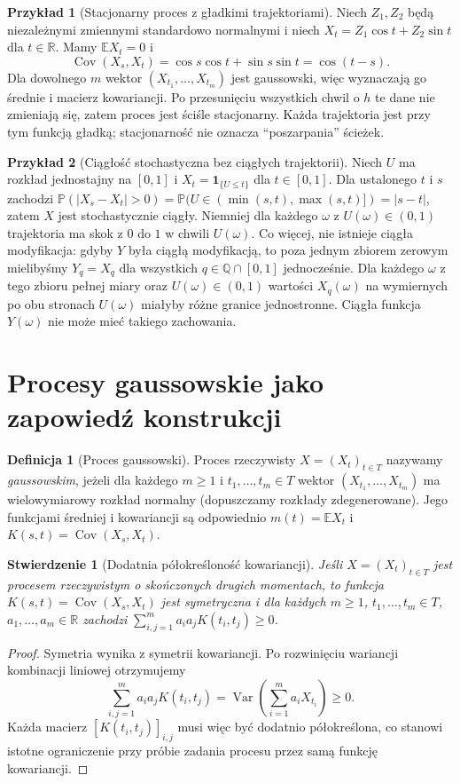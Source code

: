\documentclass[11pt,a4paper,oneside]{report}
\numberwithin{equation}{chapter}
\theoremstyle{plain}
\newtheorem{stwierdzenie}[twierdzenie]{Stwierdzenie}
\theoremstyle{definition}
\newtheorem{definicja}{Definicja}[chapter]
\newtheorem{przyklad}{Przykład}[chapter]
\theoremstyle{remark}
\newcommand{\R}{\mathbb{R}}
\newcommand{\Q}{\mathbb{Q}}
\newcommand{\Prob}{\mathbb{P}}
\newcommand{\E}{\mathbb{E}}
\newcommand{\Var}{\operatorname{Var}}
\newcommand{\Cov}{\operatorname{Cov}}
\newcommand{\ind}[1]{\mathbf{1}_{#1}}
\newcommand{\abs}[1]{\lvert #1\rvert}
\begin{document}
\begin{przyklad}[Stacjonarny proces z gładkimi trajektoriami]
Niech $Z_1,Z_2$ będą niezależnymi zmiennymi standardowo normalnymi
i niech $X_t=Z_1\cos t+Z_2\sin t$ dla $t\in\R$.
Mamy $\E X_t=0$ i
\[
\Cov(X_s,X_t)=\cos s\cos t+\sin s\sin t=\cos(t-s).
\]
Dla dowolnego $m$ wektor $(X_{t_1},\ldots,X_{t_m})$
jest gaussowski, więc wyznaczają go średnie i macierz kowariancji.
Po przesunięciu wszystkich chwil o $h$ te dane nie zmieniają się,
zatem proces jest ściśle stacjonarny. Każda trajektoria jest przy
tym funkcją gładką; stacjonarność nie oznacza ``poszarpania'' ścieżek.
\end{przyklad}

\begin{przyklad}[Ciągłość stochastyczna bez ciągłych trajektorii]
Niech $U$ ma rozkład jednostajny na $[0,1]$ i
$X_t=\ind{\{U\le t\}}$ dla $t\in[0,1]$.
Dla ustalonego $t$ i $s$ zachodzi
$\Prob(\abs{X_s-X_t}>0)=\Prob(U\in(\min(s,t),\max(s,t)])
=\abs{s-t}$, zatem $X$ jest stochastycznie ciągły.
Niemniej dla każdego $\omega$ z $U(\omega)\in(0,1)$
trajektoria ma skok z $0$ do $1$ w chwili $U(\omega)$.
Co więcej, nie istnieje ciągła modyfikacja: gdyby $Y$ była ciągłą
modyfikacją, to poza jednym zbiorem zerowym mielibyśmy
$Y_q=X_q$ dla wszystkich $q\in\Q\cap[0,1]$ jednocześnie.
Dla każdego $\omega$ z tego zbioru pełnej miary oraz
$U(\omega)\in(0,1)$ wartości $X_q(\omega)$ na wymiernych
po obu stronach $U(\omega)$ miałyby różne granice jednostronne.
Ciągła funkcja $Y(\omega)$ nie może mieć takiego zachowania.
\end{przyklad}

\section{Procesy gaussowskie jako zapowiedź konstrukcji}
\begin{definicja}[Proces gaussowski]
Proces rzeczywisty $X=(X_t)_{t\in T}$ nazywamy
\emph{gaussowskim}, jeżeli dla każdego $m\ge1$
i $t_1,\ldots,t_m\in T$ wektor
$(X_{t_1},\ldots,X_{t_m})$ ma wielowymiarowy rozkład
normalny (dopuszczamy rozkłady zdegenerowane).
Jego funkcjami średniej i kowariancji są odpowiednio
$m(t)=\E X_t$ i $K(s,t)=\Cov(X_s,X_t)$.
\end{definicja}

\begin{stwierdzenie}[Dodatnia półokreśloność kowariancji]
Jeśli $X=(X_t)_{t\in T}$ jest procesem rzeczywistym o
skończonych drugich momentach, to funkcja
$K(s,t)=\Cov(X_s,X_t)$ jest symetryczna i dla każdych
$m\ge1$, $t_1,\ldots,t_m\in T$, $a_1,\ldots,a_m\in\R$
zachodzi
$\sum_{i,j=1}^m a_i a_j K(t_i,t_j)\ge0$.
\end{stwierdzenie}
\begin{proof}
Symetria wynika z symetrii kowariancji. Po rozwinięciu
wariancji kombinacji liniowej otrzymujemy
\[
\sum_{i,j=1}^m a_i a_j K(t_i,t_j)
=\Var\left(\sum_{i=1}^m a_i X_{t_i}\right)\ge0.
\]
Każda macierz $[K(t_i,t_j)]_{i,j}$ musi więc być dodatnio
półokreślona, co stanowi istotne ograniczenie przy próbie
zadania procesu przez samą funkcję kowariancji.
\end{proof}
\end{document}

